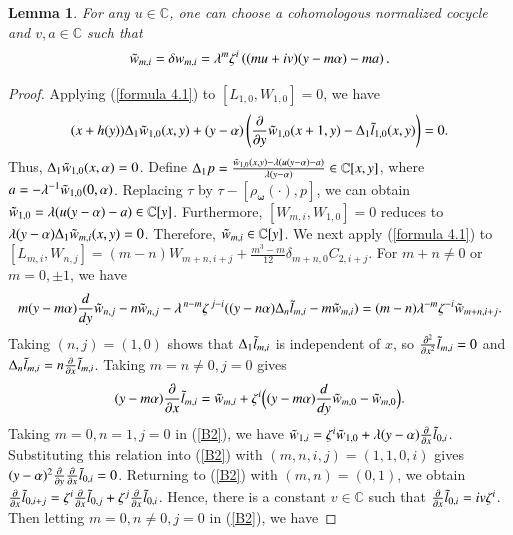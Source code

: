 \documentclass[12pt,reqno]{amsart}
\def\C{\mathbb{C}}
\numberwithin{equation}{section}
\newtheorem{lemm}[theo]{Lemma}
\begin{document}
\begin{lemm}\label{tilde w}
    For any $u\in\C$, one can choose a cohomologous normalized cocycle and $v,a\in\C$ such that 
 \begin{equation}\label{B4}
\aligned
\Tilde w_{m,i}=\delta w_{m,i}
=\lambda^m\zeta^i
 \left((mu+iv)(y-m\alpha)-ma\right).
\endaligned
\end{equation}
\end{lemm}
\begin{proof}
Applying (\ref{formula 4.1}) to $[L_{1,0},W_{1,0}]=0$, we have $$(x+h(y))\Delta_1\Tilde{w}_{1,0}(x,y)+(y-\alpha)\left(\frac{\partial}{\partial{y}}\Tilde{w}_{1,0}(x+1,y)-\Delta_1\Tilde{l}_{1,0}(x,y)    \right)=0.$$
Thus, $\Delta_1\Tilde{w}_{1,0}(x,\alpha)=0$. Define $\Delta_1p=\frac{\Tilde{w}_{1,0}(x,y)-\lambda(u(y-\alpha)-a)}{\lambda(y-\alpha)}\in\C[x,y]$, where $a=-\lambda^{-1}\Tilde{w}_{1,0}(0,\alpha)$. Replacing $\tau$ by $\tau-[\rho_{\boldsymbol{\omega}}(\cdot),p]$, we can obtain $\Tilde{w}_{1,0}=\lambda(u(y-\alpha)-a)\in\C[y]$. Furthermore, $[W_{m,i},W_{1,0}]=0$ reduces to $\lambda(y-\alpha)\Delta_1\Tilde{w}_{m,i}(x,y)=0$. Therefore, $\Tilde{w}_{m,i}\in\C[y]$.
We next apply (\ref{formula 4.1}) to $[L_{m,i},W_{n,j}]
=(m-n)W_{m+n,i+j}
+\frac{m^3-m}{12}\delta_{m+n,0}C_{2,i+j}.$
For $m+n\neq0$ or $m=0,\pm 1$, we have
\begin{equation}\label{B2}
\aligned
m(y-m\alpha)
 \frac{d}{d y}\Tilde w_{n,j}-n\Tilde w_{n,j}
-\lambda^{\,n-m}\zeta^{\,j-i}((y-n\alpha)
       \Delta_n\Tilde l_{m,i}    
-m\Tilde w_{m,i})
=(m-n)\lambda^{-m}\zeta^{-i}
 \Tilde w_{m+n,i+j}.
\endaligned
\end{equation}
Taking $(n,j)=(1,0)$ shows that $\Delta_1\Tilde l_{m,i}$ is independent of $x$, so $\frac{\partial^2}{\partial{x^2}}\Tilde l_{m,i}=0$ and $\Delta_n\Tilde l_{m,i}=n\frac{\partial}{\partial{x}}\Tilde l_{m,i}$. Taking $m=n\ne 0,j=0$ gives 
\begin{equation}\label{B2.0}
\aligned
(y-m\alpha)\frac{\partial}{\partial{x}}\Tilde l_{m,i}=\Tilde w_{m,i}+\zeta^i\Big((y-m\alpha)\frac{d}{d{y}}\Tilde w_{m,0}-\Tilde w_{m,0}\Big).
\endaligned
\end{equation}
 Taking $m=0,n=1,j=0$ in (\ref{B2}), we have $\Tilde{w}_{1,i}=\zeta^i\Tilde{w}_{1,0}+\lambda(y-\alpha)\frac{\partial}{\partial{x}}\Tilde{l}_{0,i}$. Substituting this relation into (\ref{B2}) with $(m,n,i,j)=(1,1,0,i)$ gives $(y-\alpha)^2\frac{\partial}{\partial{y}}\frac{\partial}{\partial{x}}\Tilde{l}_{0,i}=0$. Returning to (\ref{B2}) with $(m,n)=(0,1)$, we obtain $\frac{\partial}{\partial{x}}\Tilde{l}_{0,i+j}=\zeta^i\frac{\partial}{\partial{x}}\Tilde{l}_{0,j}+\zeta^j\frac{\partial}{\partial{x}}\Tilde{l}_{0,i}$. Hence, there is a constant $v\in\C$ such that $\frac{\partial}{\partial{x}}\Tilde{l}_{0,i}=iv\zeta^i$. Then letting $m=0,n\neq0,j=0$ in (\ref{B2}), we have

\end{proof}
\end{document}
